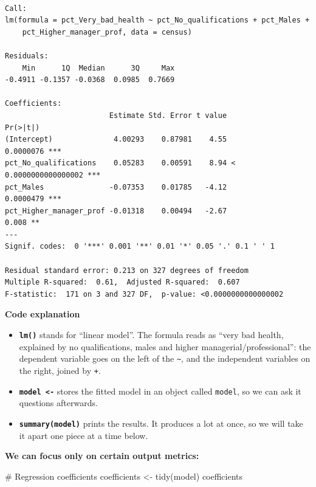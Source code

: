 \documentclass[
  letterpaper,
  DIV=11,
  numbers=noendperiod]{scrreprt}
\newenvironment{Shaded}{\begin{snugshade}}{\end{snugshade}}
\newcommand{\CommentTok}[1]{\textcolor[rgb]{0.37,0.37,0.37}{#1}}
\newcommand{\FunctionTok}[1]{\textcolor[rgb]{0.28,0.35,0.67}{#1}}
\newcommand{\NormalTok}[1]{\textcolor[rgb]{0.00,0.23,0.31}{#1}}
\newcommand{\OtherTok}[1]{\textcolor[rgb]{0.00,0.23,0.31}{#1}}
\providecommand{\tightlist}{%
  \setlength{\itemsep}{0pt}\setlength{\parskip}{0pt}}
\begin{document}
\begin{verbatim}

Call:
lm(formula = pct_Very_bad_health ~ pct_No_qualifications + pct_Males + 
    pct_Higher_manager_prof, data = census)

Residuals:
    Min      1Q  Median      3Q     Max 
-0.4911 -0.1357 -0.0368  0.0985  0.7669 

Coefficients:
                        Estimate Std. Error t value             Pr(>|t|)    
(Intercept)              4.00293    0.87981    4.55            0.0000076 ***
pct_No_qualifications    0.05283    0.00591    8.94 < 0.0000000000000002 ***
pct_Males               -0.07353    0.01785   -4.12            0.0000479 ***
pct_Higher_manager_prof -0.01318    0.00494   -2.67                0.008 ** 
---
Signif. codes:  0 '***' 0.001 '**' 0.01 '*' 0.05 '.' 0.1 ' ' 1

Residual standard error: 0.213 on 327 degrees of freedom
Multiple R-squared:  0.61,  Adjusted R-squared:  0.607 
F-statistic:  171 on 3 and 327 DF,  p-value: <0.0000000000000002
\end{verbatim}

\textbf{Code explanation}

\begin{itemize}
\tightlist
\item
  \textbf{\texttt{lm()}} stands for ``linear model''. The formula reads
  as ``very bad health, explained by no qualifications, males and higher
  managerial/professional'': the dependent variable goes on the left of
  the \texttt{\textasciitilde{}}, and the independent variables on the
  right, joined by \texttt{+}.
\item
  \textbf{\texttt{model\ \textless{}-}} stores the fitted model in an
  object called \texttt{model}, so we can ask it questions afterwards.
\item
  \textbf{\texttt{summary(model)}} prints the results. It produces a lot
  at once, so we will take it apart one piece at a time below.
\end{itemize}

\textbf{We can focus only on certain output metrics:}

\begin{Shaded}
\begin{Highlighting}[]
\CommentTok{\# Regression coefficients}
\NormalTok{coefficients }\OtherTok{\textless{}{-}} \FunctionTok{tidy}\NormalTok{(model)}
\NormalTok{coefficients}
\end{Highlighting}
\end{Shaded}
\end{document}
